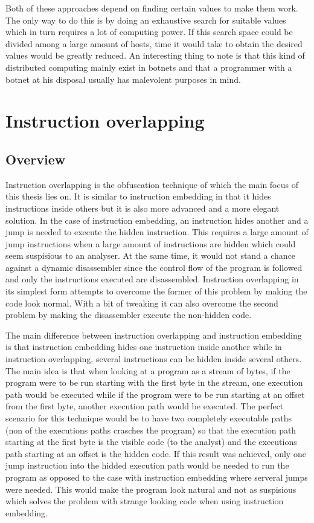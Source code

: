 \documentclass[11pt,twoside]{eitExjobb}
\begin{document}
Both of these approaches depend on finding certain values to make them work. The only way to do this is by doing an exhaustive search for suitable values which in turn requires a lot of computing power. If this search space could be divided among a large amount of hosts, time it would take to obtain the desired values would be greatly reduced. An interesting thing to note is that this kind of distributed computing mainly exist in botnets and that a programmer with a botnet at his disposal usually has malevolent purposes in mind. 

\chapter{Instruction overlapping}
\section{Overview}
Instruction overlapping is the obfuscation technique of which the main focus of this thesis lies on. It is similar to instruction embedding in that it hides instructions inside others but it is also more advanced and a more elegant solution. In the case of instruction embedding, an instruction hides another and a jump is needed to execute the hidden instruction. This requires a large amount of jump instructions when a large amount of instructions are hidden which could seem suspisious to an analyser. At the same time, it would not stand a chance against a dynamic disassembler since the control flow of the program is followed and only the instructions executed are disassembled. Instruction overlapping in its simplest form attempts to overcome the former of this problem by making the code look normal. With a bit of tweaking it can also overcome the second problem by making the disassembler execute the non-hidden code.

The main difference between instruction overlapping and instruction embedding is that instruction embedding hides one instruction inside another while in instruction overlapping, several instructions can be hidden inside several others. The main idea is that when looking at a program as a stream of bytes, if the program were to be run starting with the first byte in the stream, one execution path would be executed while if the program were to be run starting at an offset from the first byte, another execution path would be executed. The perfect scenario for this technique would be to have two completely executable paths (non of the executions paths crasches the program) so that the execution path starting at the first byte is the visible code (to the analyst) and the executions path starting at an offset is the hidden code. If this result was achieved, only one jump instruction into the hidded execution path would be needed to run the program as opposed to the case with instruction embedding where serveral jumps were needed. This would make the program look natural and not as suspisious which solves the problem with strange looking code when using instruction embedding.\cite{instructionoverlapping}
\end{document}
